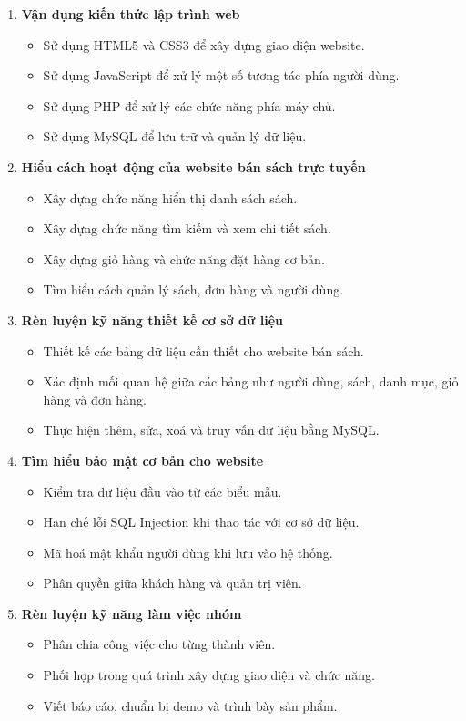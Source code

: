 \begin{enumerate}
	\item \textbf{Vận dụng kiến thức lập trình web}
	\begin{itemize}
		\item Sử dụng HTML5 và CSS3 để xây dựng giao diện website.
		\item Sử dụng JavaScript để xử lý một số tương tác phía người dùng.
		\item Sử dụng PHP để xử lý các chức năng phía máy chủ.
		\item Sử dụng MySQL để lưu trữ và quản lý dữ liệu.
	\end{itemize}
	
	\item \textbf{Hiểu cách hoạt động của website bán sách trực tuyến}
	\begin{itemize}
		\item Xây dựng chức năng hiển thị danh sách sách.
		\item Xây dựng chức năng tìm kiếm và xem chi tiết sách.
		\item Xây dựng giỏ hàng và chức năng đặt hàng cơ bản.
		\item Tìm hiểu cách quản lý sách, đơn hàng và người dùng.
	\end{itemize}
	
	\item \textbf{Rèn luyện kỹ năng thiết kế cơ sở dữ liệu}
	\begin{itemize}
		\item Thiết kế các bảng dữ liệu cần thiết cho website bán sách.
		\item Xác định mối quan hệ giữa các bảng như người dùng, sách, danh mục, giỏ hàng và đơn hàng.
		\item Thực hiện thêm, sửa, xoá và truy vấn dữ liệu bằng MySQL.
	\end{itemize}
	
	\item \textbf{Tìm hiểu bảo mật cơ bản cho website}
	\begin{itemize}
		\item Kiểm tra dữ liệu đầu vào từ các biểu mẫu.
		\item Hạn chế lỗi SQL Injection khi thao tác với cơ sở dữ liệu.
		\item Mã hoá mật khẩu người dùng khi lưu vào hệ thống.
		\item Phân quyền giữa khách hàng và quản trị viên.
	\end{itemize}
	
	\item \textbf{Rèn luyện kỹ năng làm việc nhóm}
	\begin{itemize}
		\item Phân chia công việc cho từng thành viên.
		\item Phối hợp trong quá trình xây dựng giao diện và chức năng.
		\item Viết báo cáo, chuẩn bị demo và trình bày sản phẩm.
	\end{itemize}
\end{enumerate}

